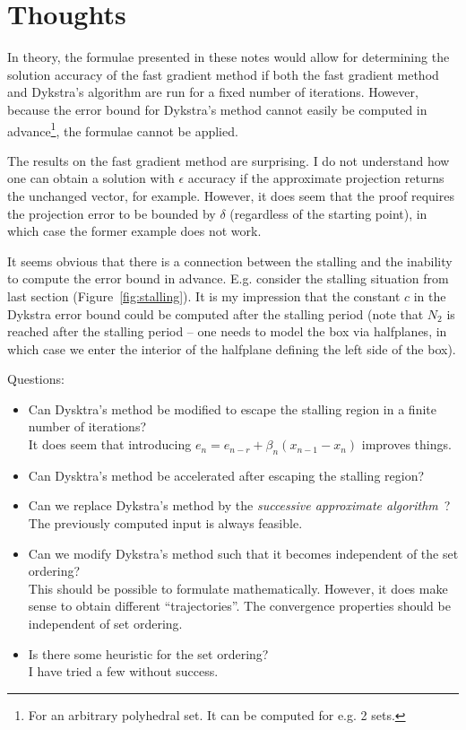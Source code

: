 \documentclass[hidelinks]{article}
\begin{document}
\section{Thoughts}
%
In theory, the formulae presented in these notes would allow for determining the solution accuracy of the fast gradient method if both the fast gradient method and Dykstra's algorithm are run for a fixed number of iterations. However, because the error bound for Dykstra's method cannot easily be computed in advance\footnote{For an arbitrary polyhedral set. It can be computed for e.g. 2 sets.}, the formulae cannot be applied.

The results on the fast gradient method are surprising. I do not understand how one can obtain a solution with $\epsilon$ accuracy if the approximate projection returns the unchanged vector, for example. However, it does seem that the proof requires the projection error to be bounded by $\delta$ (regardless of the starting point), in which case the former example does not work.

It seems obvious that there is a connection between the stalling and the inability to compute the error bound in advance. E.g. consider the stalling situation from last section (Figure~\ref{fig:stalling}). It is my impression that the constant $c$ in the Dykstra error bound could be computed after the stalling period (note that $N_2$ is reached after the stalling period -- one needs to model the box via halfplanes, in which case we enter the interior of the halfplane defining the left side of the box).

Questions:
\begin{itemize}
\item Can Dysktra's method be modified to escape the stalling region in a finite number of iterations?\\
It does seem that introducing $e_n=e_{n-r}+\beta_n (x_{n-1}-x_n)$ improves things.
\item Can Dysktra's method be accelerated after escaping the stalling region?\\
\item Can we replace Dykstra's method by the \emph{successive approximate algorithm}~\cite{XUPOLY}?\\
The previously computed input is always feasible.
\item Can we modify Dykstra's method such that it becomes independent of the set ordering?\\
This should be possible to formulate mathematically. However, it does make sense to obtain different ``trajectories''. The convergence properties should be independent of set ordering.
\item Is there some heuristic for the set ordering?\\
I have tried a few without success.
\end{itemize}
%
\end{document}
